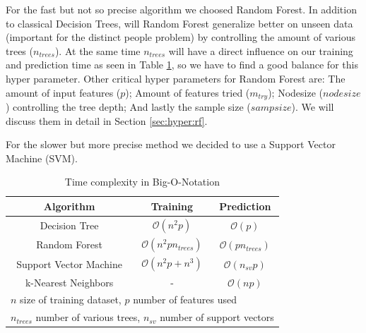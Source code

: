\documentclass[conference]{IEEEtran}
\begin{document}
\textcolor{til}{
    For the fast but not so precise algorithm we choosed Random Forest. In addition to classical Decision Trees, will Random Forest generalize better on unseen data (important for the distinct people problem) by controlling the amount of various trees ($n_{trees}$). At the same time $n_{trees}$ will have a direct influence on our training and prediction time as seen in Table \ref{table:timeComplexity}, so we have to find a good balance for this hyper parameter. Other critical hyper parameters for Random Forest are: The amount of input features ($p$); Amount of features tried ($m_{try}$); Nodesize (${nodesize}$) controlling the tree depth; And lastly the sample size (${sampsize}$). We will discuss them in detail in Section \ref{sec:hyper:rf}.}

\textcolor{maxim}{
    For the slower but more precise method we decided to use a Support Vector Machine (SVM). 
}



\begin{table}[htbp]
    \color{til}
    \caption{\color{til}Time complexity in Big-O-Notation}
    \begin{center}
    \begin{tabular}{|c|c|c|}
        \hline
        \textbf{Algorithm} & \textbf{Training} & \textbf{Prediction} \\
        \hline
        Decision Tree & $\mathcal{O}(n^2p)$ & $\mathcal{O}(p)$ \\
        \hline
        Random Forest & $\mathcal{O}(n^2pn_{trees})$ & $\mathcal{O}(pn_{trees})$ \\
        \hline
        Support Vector Machine & $\mathcal{O}(n^2p+n^3)$ & $\mathcal{O}(n_{sv}p)$ \\
        \hline
        k-Nearest Neighbors & - & $\mathcal{O}(np)$ \\
        \hline
        \multicolumn{3}{l}{$n$ size of training dataset, $p$ number of features used } \\
        \multicolumn{3}{l}{$n_{trees}$ number of various trees, $n_{sv}$ number of support vectors } \\
    \end{tabular}
    \label{table:timeComplexity}
    \end{center}
\end{table}
\end{document}
